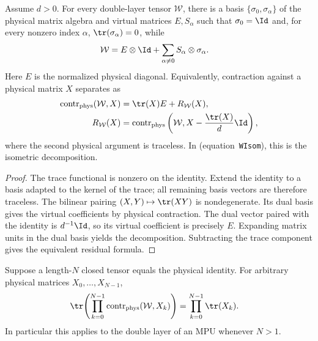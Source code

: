 \begin{lemma}
    \label{thm:mpu_WIsom}
    \leanok
    Assume $d>0$.  For every double-layer tensor $\mathcal W$, there is a basis
    $\{\sigma_0,\sigma_\alpha\}$ of the physical matrix algebra and virtual
    matrices $E,S_\alpha$ such that $\sigma_0=\Id$ and, for every nonzero
    index $\alpha$, $\tr(\sigma_\alpha)=0$, while
    \begin{align}
        \mathcal W & =E\otimes\Id+
        \sum_{\alpha\ne0}S_\alpha\otimes\sigma_\alpha.
    \end{align}
    Here $E$ is the normalized physical diagonal.  Equivalently, contraction
    against a physical matrix $X$ separates as
    \begin{align}
        \operatorname{contr}_{\rm phys}(\mathcal W,X)
         & =\tr(X)E+R_{\mathcal W}(X),      \\
        R_{\mathcal W}(X)
         & =\operatorname{contr}_{\rm phys}
        \left(\mathcal W,
        X-\frac{\tr(X)}d\Id\right),
    \end{align}
    where the second physical argument is traceless.  In \cite[Proposition~III.3(ii)]{Cirac2017MPU} (equation~\texttt{WIsom}), this is the isometric
    decomposition.
\end{lemma}

\begin{proof}\leanok
    The trace functional is nonzero on the identity.  Extend the identity to
    a basis adapted to the kernel of the trace; all remaining basis vectors
    are therefore traceless.  The bilinear pairing
    $(X,Y)\mapsto\tr(XY)$ is nondegenerate.  Its dual basis gives the virtual
    coefficients by physical contraction.  The dual vector paired with the
    identity is $d^{-1}\Id$, so its virtual coefficient is precisely $E$.
    Expanding matrix units in the dual basis yields the decomposition.
    Subtracting the trace component gives the equivalent residual formula.
\end{proof}

\begin{lemma}
    \label{thm:mpu_multilinear_physical_contraction}
    \leanok
    Suppose a length-$N$ closed tensor equals the physical identity.  For
    arbitrary physical matrices $X_0,\ldots,X_{N-1}$,
    \begin{align}
        \tr\!\left(\prod_{k=0}^{N-1}
        \operatorname{contr}_{\rm phys}(\mathcal W,X_k)\right)
         & =\prod_{k=0}^{N-1}\tr(X_k).
    \end{align}
    In particular this applies to the double layer of an MPU whenever $N>1$.
\end{lemma}

